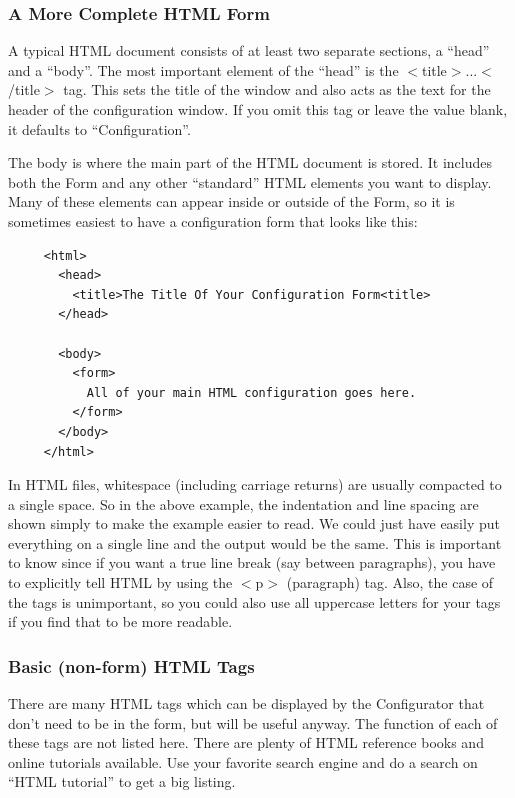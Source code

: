 \subsubsection*{A More Complete HTML Form}

A typical HTML document consists of at least two separate sections,
a {}``head'' and a {}``body''. The most important element of the
{}``head'' is the $<$title$>$...$<$/title$>$ tag. This sets the title of
the window and also acts as the text for the header of the configuration
window. If you omit this tag or leave the value blank, it defaults
to {}``Configuration''.

The body is where the main part of the HTML document is stored. It
includes both the Form and any other {}``standard'' HTML elements
you want to display. Many of these elements can appear inside or outside
of the Form, so it is sometimes easiest to have a configuration form
that looks like this:

\begin{footnotesize}
\begin{verbatim}
     <html>
       <head>
         <title>The Title Of Your Configuration Form<title>
       </head>

       <body> 
         <form> 
           All of your main HTML configuration goes here.
         </form> 
       </body> 
     </html>
\end{verbatim}
\end{footnotesize}

In HTML files, whitespace (including carriage returns) are usually
compacted to a single space. So in the above example, the indentation
and line spacing are shown simply to make the example easier to read.
We could just have easily put everything on a single line and the
output would be the same. This is important to know since if you want
a true line break (say between paragraphs), you have to explicitly
tell HTML by using the $<$p$>$ (paragraph) tag. Also, the case of the
tags is unimportant, so you could also use all uppercase letters for
your tags if you find that to be more readable.


\subsubsection*{Basic (non-form) HTML Tags}

There are many HTML tags which can be displayed by the Configurator
that don't need to be in the form, but will be useful anyway. The
function of each of these tags are not listed here. There are plenty
of HTML reference books and online tutorials available. Use your favorite
search engine and do a search on {}``HTML tutorial'' to get a big
listing.


